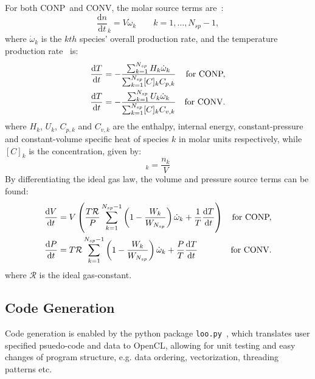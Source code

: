 \documentclass[12pt,number,sort&compress]{elsarticle}
\newcommand{\ns}{N_{sp}}
\newcommand{\conp}{CONP}
\newcommand{\conv}{CONV}
\newcommand{\dconp}{\ifmmode\text{for \conp,}\else for \conp,\fi}
\newcommand{\dconv}{\ifmmode\text{for \conv,}\else for \conv.\fi}
\newcommand{\Ru}{\mathcal{R}}
\begin{document}
For both \conp~and \conv, the molar source terms are~\cite{TurnsStephenR2012Aitc}:
\begin{equation}
\frac{\text{d} n }{\text{d} t }_{k} = V \dot{\omega}_{k} \qquad k = 1, \ldots, \ns - 1, \label{e:spec}
\end{equation}
where $\dot{\omega}_k$ is the $kth$ species' overall production rate, and the temperature production rate~\cite{TurnsStephenR2012Aitc} is:
\begin{subequations}
\label{e:temperature_incomplete}
\begin{align}
\frac{\text{d} T }{\text{d} t } &= - \frac{\sum_{k=1}^{\ns} H_{k} \dot{\omega}_{k}}{\sum_{k=1}^{\ns} [C]_{k} {C_{p, k}}} & \text{\dconp} \\
\frac{\text{d} T }{\text{d} t } &= - \frac{\sum_{k=1}^{\ns} U_{k} \dot{\omega}_{k}}{\sum_{k=1}^{\ns} [C]_{k} {C_{v, k}}} & \text{\dconv}
\end{align}
\end{subequations}
where $H_k$, $U_k$, $C_{p,k}$ and $C_{v, k}$ are the enthalpy, internal energy, constant-pressure and constant-volume specific heat of species $k$ in molar units respectively, while $[C]_{k}$ is the concentration, given by:
\begin{equation}
 [C]_{k} = \frac{n_{k}}{V}
\end{equation}
By differentiating the ideal gas law, the volume and pressure source terms can be found:
\begin{subequations}
\label{e:param_complete}
\begin{align}
\frac{\text{d} V }{\text{d} t } &= V \left(\frac{T \Ru}{P} \sum_{k=1}^{\ns  - 1} \left(1 - \frac{W_{k}}{W_{\ns}}\right) \dot{\omega}_{k} + \frac{1}{T} \frac{\text{d} T }{\text{d} t }\right)& \text{\dconp} \\
\frac{\text{d} P }{\text{d} t } &= T \Ru \sum_{k=1}^{\ns  - 1} \left(1 - \frac{W_{k}}{W_{\ns}}\right) \dot{\omega}_{k} + \frac{P}{T} \frac{\text{d} T }{\text{d} t }&\text{\dconv}
\end{align}
\end{subequations}
where $\mathcal{R}$ is the ideal gas-constant.

\subsection{Code Generation}
Code generation is enabled by the python package \texttt{loo.py}~\cite{kloeckner_loopy_2014}, which translates user specified psuedo-code and data to OpenCL, allowing for unit testing and easy changes of program structure, e.g. data ordering, vectorization, threading patterns etc.
\end{document}
